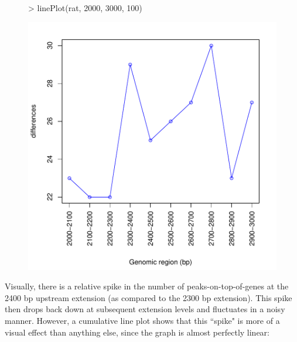\documentclass[12pt]{article}
\begin{document}
\begin{figure}[H]
\begin{center}
\begin{Schunk}
\begin{Sinput}
> linePlot(rat, 2000, 3000, 100)
\end{Sinput}
\end{Schunk}
\includegraphics{geneXtendeR-017}
\end{center}
\end{figure}

Visually, there is a relative spike in the number of peaks-on-top-of-genes at the 2400 bp upstream extension (as compared to the 2300 bp extension).  This spike then drops back down at subsequent extension levels and fluctuates in a noisy manner.  However, a cumulative line plot shows that this ``spike" is more of a visual effect than anything else, since the graph is almost perfectly linear:
\end{document}
